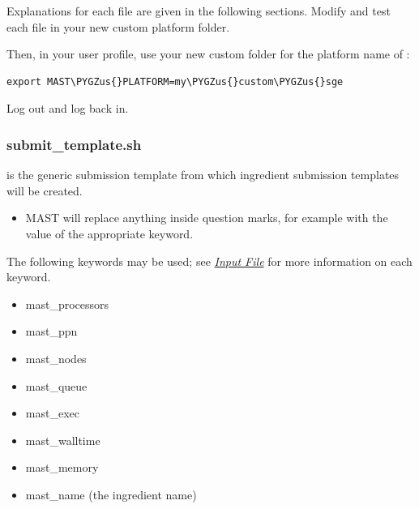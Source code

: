 \documentclass[letterpaper,10pt,english]{sphinxmanual}
\def\PYGZus{\char`\_}
\begin{document}
Explanations for each file are given in the following sections. Modify and test each file in your new custom platform folder.

Then, in your user profile, use your new custom folder for the platform name of :

\begin{Verbatim}[commandchars=\\\{\}]
export MAST\PYGZus{}PLATFORM=my\PYGZus{}custom\PYGZus{}sge
\end{Verbatim}

Log out and log back in.


\subsubsection{submit\_template.sh}
\label{1_0_installation:submit-template-sh}
 is the generic submission template from which ingredient submission templates will be created.
\begin{itemize}
\item {} 
MAST will replace anything inside question marks, for example  with the value of the appropriate keyword.

\end{itemize}

The following keywords may be used; see {\hyperref[3_0_inputfile::doc]{\emph{Input File}}} for more information on each keyword.
\begin{itemize}
\item {} 
mast\_processors

\item {} 
mast\_ppn

\item {} 
mast\_nodes

\item {} 
mast\_queue

\item {} 
mast\_exec

\item {} 
mast\_walltime

\item {} 
mast\_memory

\item {} 
mast\_name (the ingredient name)

\end{itemize}
\end{document}
